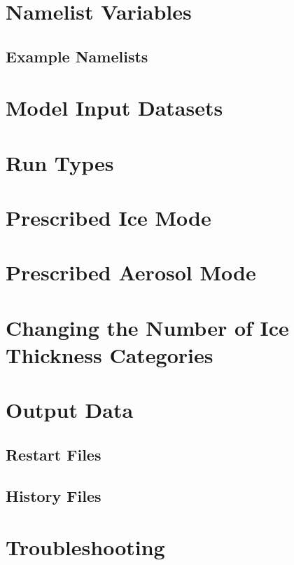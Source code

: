 \documentclass[]{article}
\begin{document}
    

\section{Namelist Variables}
  \label{namelist}
  
    \subsection{Example Namelists}
    

\section{Model Input Datasets}
  

\section{Run Types}
  \label{runtypes}
  

\section{Prescribed Ice Mode}
  \label{prescribed}
  

\section{Prescribed Aerosol Mode}
  \label{prescraero}
  

\section{Changing the Number of Ice Thickness Categories}
  \label{ncat}
  

\section{Output Data}
  
    \subsection{Restart Files}
      \label{restart_files}
      
    \subsection{History Files}
      \label{history_files}
      \label{history}
      

\section{Troubleshooting}
  

\newpage
 
\end{document}
